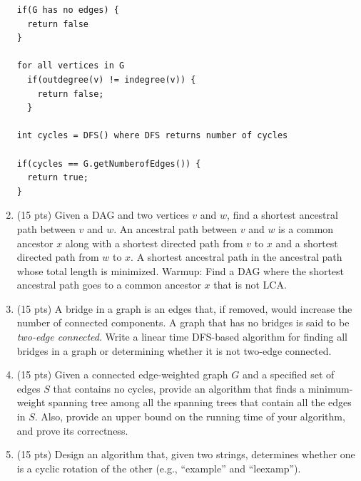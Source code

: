 \documentclass{article}
\begin{document}
\begin{enumerate}
\begin{lstlisting}
if(G has no edges) {
  return false
}

for all vertices in G
  if(outdegree(v) != indegree(v)) {
    return false;
  }
  
int cycles = DFS() where DFS returns number of cycles 

if(cycles == G.getNumberofEdges()) {
  return true;
}
\end{lstlisting}
\newpage

\item (15 pts) Given a DAG and two vertices $v$ and $w$, find a shortest ancestral path between $v$ and $w$. An ancestral path between $v$ and $w$ is a common ancestor $x$ along with a shortest directed path from $v$ to $x$ and a shortest directed path from $w$ to $x$. A shortest ancestral path in the ancestral path whose total length is minimized. Warmup: Find a DAG where the shortest ancestral path goes to a common ancestor $x$ that is not LCA. 

\newpage

\item (15 pts) A bridge in a graph is an edges that, if removed, would increase the number of connected components. A graph that has no bridges is said to be {\em two-edge connected}. Write a linear time DFS-based algorithm for finding all bridges in a graph or determining whether it is not two-edge connected.

\newpage

\item (15 pts) Given a connected edge-weighted graph $G$ and a specified set of edges $S$ that contains no cycles, provide an algorithm that finds a minimum-weight spanning tree among all the spanning trees that contain all the edges in $S$. Also, provide an upper bound on the running time of your algorithm, and prove its correctness.

\newpage

\item (15 pts) Design an algorithm that, given two strings, determines whether one is a cyclic rotation of the other (e.g., ``example'' and ``leexamp'').

\end{enumerate}
\end{document}
